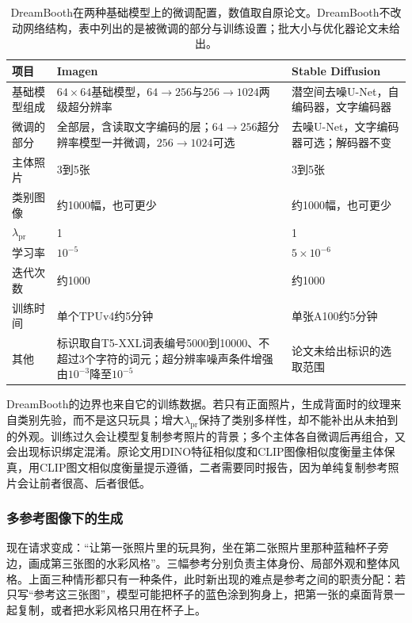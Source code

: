 \begin{table}[htbp]
 \centering
 \small
 \begin{tabularx}{\linewidth}{@{}p{22mm}XX@{}}
  \toprule
  项目 & Imagen & Stable Diffusion\\
  \midrule
  基础模型组成 & $64\times64$基础模型，$64\to256$与$256\to1024$两级超分辨率 & 潜空间去噪U-Net，自编码器，文字编码器\\
  微调的部分 & 全部层，含读取文字编码的层；$64\to256$超分辨率模型一并微调，$256\to1024$可选 & 去噪U-Net，文字编码器可选；解码器不变\\
  主体照片 & 3到5张 & 3到5张\\
  类别图像 & 约1000幅，也可更少 & 约1000幅，也可更少\\
  $\lambda_{\mathrm{pr}}$ & 1 & 1\\
  学习率 & $10^{-5}$ & $5\times10^{-6}$\\
  迭代次数 & 约1000 & 约1000\\
  训练时间 & 单个TPUv4约5分钟 & 单张A100约5分钟\\
  其他 & 标识取自T5-XXL词表编号5000到10000、不超过3个字符的词元；超分辨率噪声条件增强由$10^{-3}$降至$10^{-5}$ & 论文未给出标识的选取范围\\
  \bottomrule
 \end{tabularx}
 \caption{DreamBooth在两种基础模型上的微调配置，数值取自原论文。DreamBooth不改动网络结构，表中列出的是被微调的部分与训练设置；批大小与优化器论文未给出。}
 \label{tab:vision-dreambooth-config}
\end{table}

DreamBooth的边界也来自它的训练数据。若只有正面照片，生成背面时的纹理来自类别先验，而不是这只玩具；增大$\lambda_{\mathrm{pr}}$保持了类别多样性，却不能补出从未拍到的外观。训练过久会让模型复制参考照片的背景；多个主体各自微调后再组合，又会出现标识绑定混淆。原论文用DINO特征相似度和CLIP图像相似度衡量主体保真，用CLIP图文相似度衡量提示遵循，二者需要同时报告，因为单纯复制参考照片会让前者很高、后者很低。

\subsubsection{多参考图像下的生成}
\label{sec:vision-generation-reference-roles}

现在请求变成：“让第一张照片里的玩具狗，坐在第二张照片里那种蓝釉杯子旁边，画成第三张图的水彩风格”。三幅参考分别负责主体身份、局部外观和整体风格。上面三种情形都只有一种条件，此时新出现的难点是参考之间的职责分配：若只写“参考这三张图”，模型可能把杯子的蓝色涂到狗身上，把第一张的桌面背景一起复制，或者把水彩风格只用在杯子上。


